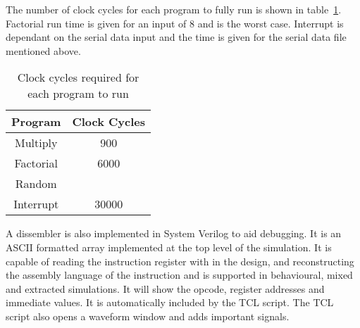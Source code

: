 

The number of clock cycles for each program to fully run is shown in table~\ref{tab:runtimes}. 
Factorial run time is given for an input of 8 and is the worst case. 
Interrupt is dependant on the serial data input and the time is given for the serial data file mentioned above.

\begin{table}
\centering
\caption{Clock cycles required for each program to run}
\label{tab:runtimes}
\begin{tabular}{|c|c|}
Program & Clock Cycles \\ \hline
Multiply	& 900	\\
Factorial	& 6000	\\
Random		& 	\\
Interrupt	& 30000	\\ \hline
\end{tabular}
\end{table}

A dissembler is also implemented in System Verilog to aid debugging.
It is an ASCII formatted array implemented at the top level of the simulation. 
It is capable of reading the instruction register with in the design, and reconstructing the assembly language of the instruction and is supported in behavioural, mixed and extracted simulations.
It will show the opcode, register addresses and immediate values.
It is automatically included by the TCL script.
The TCL script also opens a waveform window and adds important signals.




